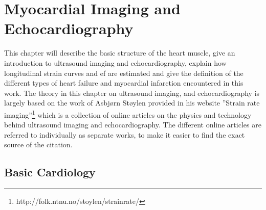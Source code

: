 \chapter{Myocardial Imaging and Echocardiography} \label{chap:strain}

This chapter will describe the basic structure of the heart muscle, give an introduction to ultrasound imaging and echocardiography, explain how longitudinal strain curves and \acrfull{ef} are estimated and give the definition of the different types of heart failure and myocardial infarction encountered in this work. The theory in this chapter on ultrasound imaging, and echocardiography is largely based on the work of Asbjørn Støylen provided in his website ''Strain rate imaging''\footnote{http://folk.ntnu.no/stoylen/strainrate/} which is a collection of online articles on the physics and technology behind ultrasound imaging and echocardiography. The different online articles are referred to individually as separate works, to make it easier to find the exact source of the citation.

\section{Basic Cardiology}

